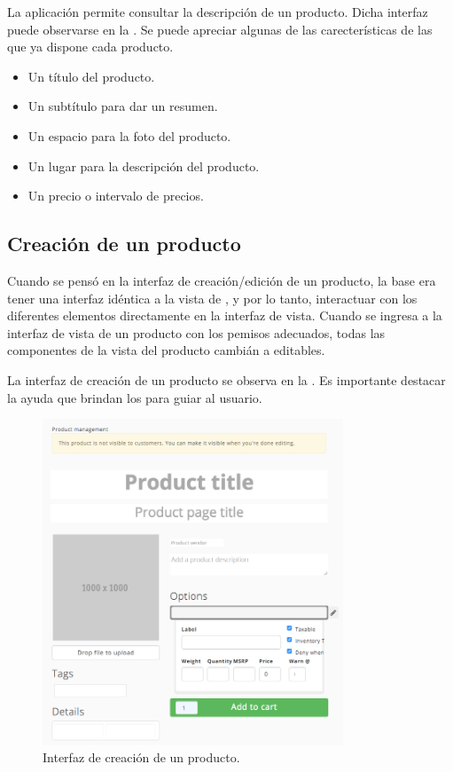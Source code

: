 		La aplicación permite consultar la descripción de un producto. Dicha interfaz puede observarse en la . Se puede apreciar algunas de las carecterísticas de las que ya dispone cada producto.

		\begin{itemize}
			\item
				Un título del producto.
			\item
				Un subtítulo para dar un resumen.
			\item
				Un espacio para la foto del producto.
			\item
				Un lugar para la descripción del producto.
			\item
				Un precio o intervalo de precios.
		\end{itemize}

	\subsection{Creación de un producto}

		Cuando se pensó en la interfaz de creación/edición de un producto, la base era tener una interfaz idéntica a la vista de , y por lo tanto, interactuar con los diferentes elementos directamente en la interfaz de vista.
		Cuando se ingresa a la interfaz de vista de un producto con los pemisos adecuados, todas las componentes de la vista del producto cambián a editables.

		La interfaz de creación de un producto se observa en la . Es importante destacar la ayuda que brindan los \placeholdersINT para guiar al usuario.

		\begin{figure}[H]
			\centering
			\includegraphics[width=0.8\textwidth]{figuras/solution/product/create/form.png}

			\caption{Interfaz de creación de un producto.}
			\label{figure:solution:product:create:form}
		\end{figure}

